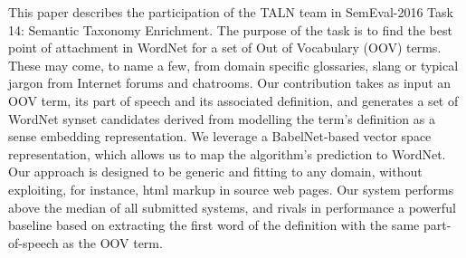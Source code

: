 This paper describes the participation of the TALN team in SemEval-2016 Task 14: Semantic Taxonomy Enrichment. The purpose of the task is to find the best point of attachment in WordNet for a set of Out of Vocabulary (OOV) terms. These may come, to name a few, from domain specific glossaries, slang or typical jargon from Internet forums and chatrooms. Our contribution takes as input an OOV term, its part of speech and its associated definition, and generates a set of WordNet synset candidates derived from modelling the term's definition as a sense embedding representation. We leverage a BabelNet-based vector space representation, which allows us to map the algorithm's prediction to WordNet. Our approach is designed to be generic and fitting to any domain, without exploiting, for instance, html markup in source web pages. Our system performs above the median of all submitted systems, and rivals in performance a powerful baseline based on extracting the first word of the definition with the same part-of-speech as the OOV term.
